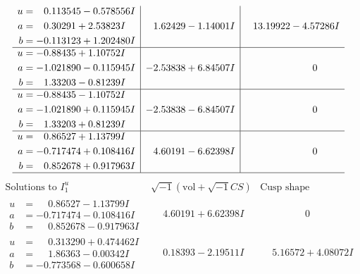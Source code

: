 \documentclass[1p]{elsarticle_modified}
\theoremstyle{definition}
\newcommand{\I}{\sqrt{-1}}
\begin{document}
$$\begin{array}{c|c|c}
\begin{aligned}
u &= \phantom{-}0.113545 - 0.578556 I \\
a &= \phantom{-}0.30291 + 2.53823 I \\
b &= -0.113123 + 1.202480 I\end{aligned}
 & \phantom{-}1.62429 - 1.14001 I & \phantom{-}13.19922 - 4.57286 I \\ \hline\begin{aligned}
u &= -0.88435 + 1.10752 I \\
a &= -1.021890 - 0.115945 I \\
b &= \phantom{-}1.33203 - 0.81239 I\end{aligned}
 & -2.53838 + 6.84507 I & \phantom{-0.000000 } 0 \\ \hline\begin{aligned}
u &= -0.88435 - 1.10752 I \\
a &= -1.021890 + 0.115945 I \\
b &= \phantom{-}1.33203 + 0.81239 I\end{aligned}
 & -2.53838 - 6.84507 I & \phantom{-0.000000 } 0 \\ \hline\begin{aligned}
u &= \phantom{-}0.86527 + 1.13799 I \\
a &= -0.717474 + 0.108416 I \\
b &= \phantom{-}0.852678 + 0.917963 I\end{aligned}
 & \phantom{-}4.60191 - 6.62398 I & \phantom{-0.000000 } 0\\
 \hline 
 \end{array}$$\newpage$$\begin{array}{c|c|c}  
\text{Solutions to }I^u_{1}& \I (\text{vol} + \sqrt{-1}CS) & \text{Cusp shape}\\
 \hline 
\begin{aligned}
u &= \phantom{-}0.86527 - 1.13799 I \\
a &= -0.717474 - 0.108416 I \\
b &= \phantom{-}0.852678 - 0.917963 I\end{aligned}
 & \phantom{-}4.60191 + 6.62398 I & \phantom{-0.000000 } 0 \\ \hline\begin{aligned}
u &= \phantom{-}0.313290 + 0.474462 I \\
a &= \phantom{-}1.86363 - 0.00342 I \\
b &= -0.773568 - 0.600658 I\end{aligned}
 & \phantom{-}0.18393 - 2.19511 I & \phantom{-}5.16572 + 4.08072 I \\ \hline\begin{aligned}

\end{aligned}
\end{array}$$
\end{document}
